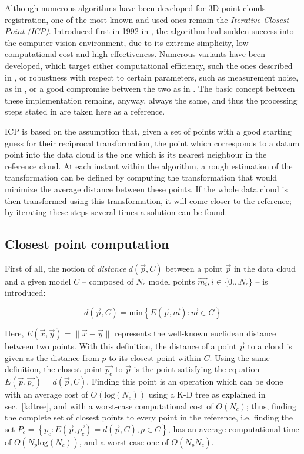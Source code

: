 Although numerous algorithms have been developed for 3D point clouds
registration, one of the most known and used ones remain the
\emph{Iterative Closest Point (\emph{ICP})}. Introduced first in 1992 in
\cite{icp}, the algorithm had sudden success into the computer vision
environment, due to its extreme simplicity, low computational cost and high
effectiveness. Numerous variants have been developed, which target either
computational efficiency, such the ones described in
\cite{icp-fast-algorithms}, or robustness with respect to certain parameters,
such as measurement noise, as in \cite{icp-bayes}, or a good compromise between the
two as in \cite{icp-robust}. The basic concept between these implementation
remains, anyway, always the same, and thus the processing steps stated in
\cite{icp} are taken here as a reference.

ICP is based on the assumption that, given a set of points with a good starting
guess for their reciprocal transformation, the point which corresponds to a
datum point into the data cloud is the one which is its
nearest neighbour in the reference cloud. At each instant within the
algorithm, a rough estimation of the transformation can be defined by computing
the transformation that would minimize the average distance between these
points. If the whole data cloud is then transformed using this transformation,
it will come closer to the reference; by iterating these steps several times a
solution can be found.

\subsection{Closest point computation}
First of all, the notion of \emph{distance} $d(\vec{p},C)$ between a point $\vec{p}$ in the data cloud
and a given model $C$ -- composed of $N_c$ model points $\vec{m_i}, i \in \{0 \dots
N_c\}$  -- is introduced:

\begin{equation}
  d(\vec{p},C) = \text{min}\left\{ E(\vec{p}, \vec{m}) : \vec{m} \in C \right\}
\end{equation}

Here, $E(\vec{x},\vec{y})=\lVert \vec{x} - \vec{y} \rVert$ represents the well-known
euclidean distance between two points. With this definition, the distance of a
point $\vec{p}$ to a cloud is given as the distance from $p$ to its closest
point within $C$. Using the same definition, the closest point $\vec{p_c}$ to
$\vec{p}$ is the point satisfying the equation $E(\vec{p},
\vec{p_c})=d(\vec{p}, C)$. Finding this point is an operation which can be done
with an average cost of $O\left(\text{log}\left(N_c\right)\right)$ using a K-D
tree as explained in sec.~\ref{kdtree}, and with a worst-case computational cost of
$O\left( N_c \right)$; thus, finding the complete set of closest points to
every point in the reference, i.e. finding the set $P_{c} = \left\{ p_c :
E(\vec{p},\vec{p_c}) = d(\vec{p},C) , p \in C \right\}$, has an average
computational time of $O\left( N_p \text{log}\left(N_c\right) \right)$, and a
worst-case one of $O\left( N_p N_c \right)$.

